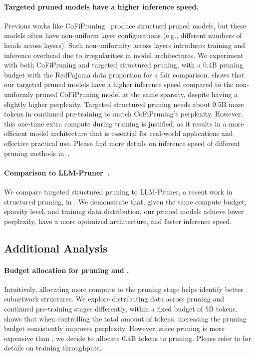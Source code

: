 \paragraph{Targeted pruned models have a higher inference speed.} 
\label{para:uniform} 
Previous works like CoFiPruning~\citep{xia-etal-2022-structured} produce structued pruned models, but these models often have non-uniform layer configurations (e.g., different numbers of heads across layers). Such non-uniformity across layers introduces training and inference overhead due to irregularities in model architectures. We experiment with both CoFiPruning and targeted structured pruning, with a 0.4B pruning budget with the RedPajama data proportion for a fair comparison.  shows that our targeted pruned models have a higher inference speed compared to the non-uniformly pruned CoFiPruning model at the same sparsity, despite having a slightly higher perplexity. Targeted structured pruning needs about 0.5B more tokens in continued pre-training to match CoFiPruning's perplexity. However, this one-time extra compute during training is justified, as it results in a more efficient model architecture that is essential for real-world applications and effective practical use. Please find more details on inference speed of different pruning methods in~.


\paragraph{Comparison to LLM-Pruner~\citep{ma2023llm}.} 
We compare targeted structured pruning to 
LLM-Pruner, a recent work in structured pruning, 
in . 
We demonstrate that, given the same compute budget, sparsity level, and training data distribution, our pruned models achieve lower perplexity, have a more optimized architecture, and faster inference speed.


 
\subsection{Additional Analysis}
\paragraph{Budget allocation for pruning and \ct{}.}
Intuitively, allocating more compute to the pruning stage helps identify better subnetwork structures. 
We explore distributing data across pruning and continued pre-training stages differently, within a fixed  budget of 5B tokens.
 shows that
when controlling the total amount of tokens, 
increasing the pruning budget consistently improves perplexity. 
However, since pruning is more expensive than \ct{}, 
we decide to allocate 0.4B tokens to  pruning. Please refer to  for details on training throughputs.

